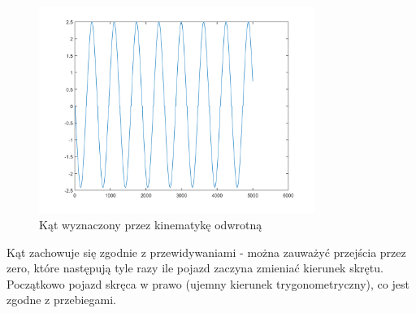 \documentclass[a4paper, 12pt]{report}
\begin{document}
				\begin{figure}[H]
					\centering
					\includegraphics[width = 0.8\textwidth]{./AP/img/rev/sin_in_3.png}
					\caption{Kąt wyznaczony przez kinematykę odwrotną}
				\end{figure}
				\noindent Kąt zachowuje się zgodnie z przewidywaniami - można zauważyć przejścia przez zero, które następują tyle razy ile pojazd zaczyna zmieniać kierunek skrętu. Początkowo pojazd skręca w prawo (ujemny kierunek trygonometryczny), co jest zgodne z przebiegami.				
			\newpage
\end{document}
